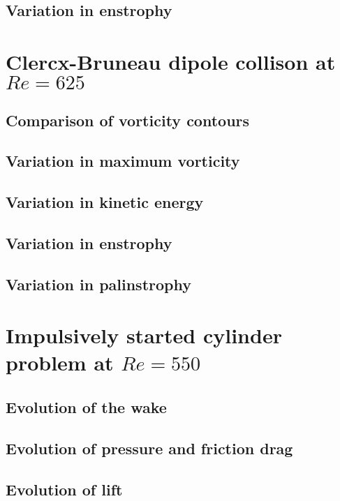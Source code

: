 \subsection{Variation in enstrophy}

\section{Clercx-Bruneau dipole collison at $Re=625$}

\subsection{Comparison of vorticity contours}

\subsection{Variation in maximum vorticity}

\subsection{Variation in kinetic energy}

\subsection{Variation in enstrophy}

\subsection{Variation in palinstrophy}

\section{Impulsively started cylinder problem at $Re=550$}

\subsection{Evolution of the wake}

\subsection{Evolution of pressure and friction drag}

\subsection{Evolution of lift}

